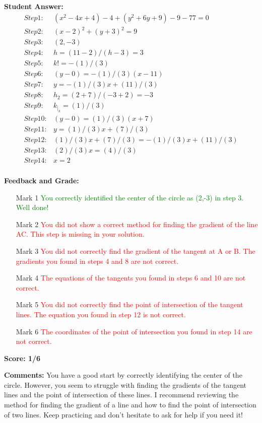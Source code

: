 \documentclass{article}
\begin{document}
\textbf{Student Answer:}
\begin{align*}
Step 1: & (x^{2}-4x+4)-4+(y^{2}+6y+9)-9-77=0 \\
Step 2: & (x-2)^{2}+(y+3)^{2}=9 \\
Step 3: & (2,-3) \\
Step 4: & h=(11-2)/(h-3)=3 \\
Step 5: & k!=-(1)/(3) \\
Step 6: & (y-0)=-(1)/(3)(x-11) \\
Step 7: & y=-(1)/(3)x+(11)/(3) \\
Step 8: & h_2=(2+7)/(-3+2)=-3 \\
Step 9: & k _|_ k=(1)/(3) \\
Step 10: & (y-0)=(1)/(3)(x+7) \\
Step 11: & y=(1)/(3)x+(7)/(3) \\
Step 12: & (1)/(3)x+(7)/(3)=-(1)/(3)x+(11)/(3) \\
Step 13: & (2)/(3)x=(4)/(3) \\
Step 14: & x=2 \\
\end{align*}

\textbf{Feedback and Grade:}
\begin{itemize}
\item[Mark 1] \textcolor{green}{You correctly identified the center of the circle as (2,-3) in step 3. Well done!}
\item[Mark 2] \textcolor{red}{You did not show a correct method for finding the gradient of the line AC. This step is missing in your solution.}
\item[Mark 3] \textcolor{red}{You did not correctly find the gradient of the tangent at A or B. The gradients you found in steps 4 and 8 are not correct.}
\item[Mark 4] \textcolor{red}{The equations of the tangents you found in steps 6 and 10 are not correct.}
\item[Mark 5] \textcolor{red}{You did not correctly find the point of intersection of the tangent lines. The equation you found in step 12 is not correct.}
\item[Mark 6] \textcolor{red}{The coordinates of the point of intersection you found in step 14 are not correct.}
\end{itemize}

\textbf{Score: 1/6}

\textbf{Comments:} You have a good start by correctly identifying the center of the circle. However, you seem to struggle with finding the gradients of the tangent lines and the point of intersection of these lines. I recommend reviewing the method for finding the gradient of a line and how to find the point of intersection of two lines. Keep practicing and don't hesitate to ask for help if you need it!
\end{document}
